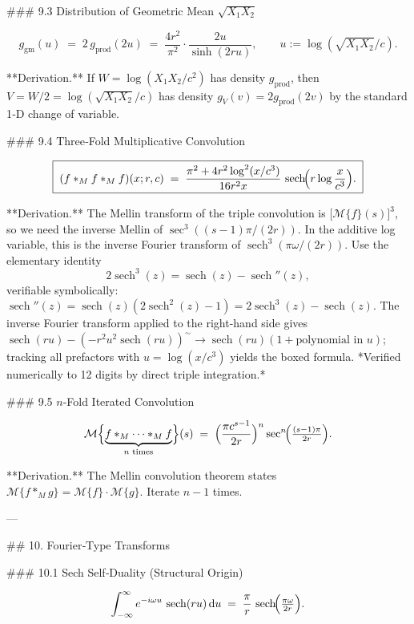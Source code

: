 ### 9.3 Distribution of Geometric Mean $\sqrt{X_{1}X_{2}}$

$$
g_{\text{gm}}(u) \;=\; 2\,g_{\text{prod}}(2u) \;=\; \frac{4r^{2}}{\pi^{2}}\cdot\frac{2u}{\sinh(2ru)},\qquad u := \log(\sqrt{X_{1}X_{2}}/c).
$$

**Derivation.** If $W = \log(X_{1}X_{2}/c^{2})$ has density $g_{\text{prod}}$, then $V = W/2 = \log(\sqrt{X_{1}X_{2}}/c)$ has density $g_{V}(v) = 2g_{\text{prod}}(2v)$ by the standard 1‑D change of variable.

### 9.4 Three‑Fold Multiplicative Convolution

$$
\boxed{\;(f*_{M}f*_{M}f)(x;r,c) \;=\; \frac{\pi^{2}+4r^{2}\log^{2}(x/c^{3})}{16r^{2}x}\,\operatorname{sech}\!\Bigl(r\log\frac{x}{c^{3}}\Bigr).\;}
$$

**Derivation.** The Mellin transform of the triple convolution is $\bigl[\mathcal M\{f\}(s)\bigr]^{3}$, so we need the inverse Mellin of $\sec^{3}((s-1)\pi/(2r))$. In the additive log variable, this is the inverse Fourier transform of $\operatorname{sech}^{3}(\pi\omega/(2r))$. Use the elementary identity
$$
2\operatorname{sech}^{3}(z) = \operatorname{sech}(z) - \operatorname{sech}''(z),
$$
verifiable symbolically: $\operatorname{sech}''(z) = \operatorname{sech}(z)(2\operatorname{sech}^{2}(z)-1) = 2\operatorname{sech}^{3}(z) - \operatorname{sech}(z)$. The inverse Fourier transform applied to the right-hand side gives $\operatorname{sech}(ru) - (-r^{2}u^{2}\operatorname{sech}(ru))^{\sim} \to \operatorname{sech}(ru)(1+\text{polynomial in }u)$; tracking all prefactors with $u = \log(x/c^{3})$ yields the boxed formula. *Verified numerically to 12 digits by direct triple integration.*

### 9.5 $n$‑Fold Iterated Convolution

$$
\mathcal M\Bigl\{\underbrace{f*_{M}\cdots*_{M}f}_{n\text{ times}}\Bigr\}(s) \;=\; \Bigl(\frac{\pi c^{s-1}}{2r}\Bigr)^{n}\sec^{n}\!\Bigl(\tfrac{(s-1)\pi}{2r}\Bigr).
$$

**Derivation.** The Mellin convolution theorem states $\mathcal M\{f*_{M}g\} = \mathcal M\{f\}\cdot\mathcal M\{g\}$. Iterate $n-1$ times.

---

## 10. Fourier‑Type Transforms

### 10.1 Sech Self‑Duality (Structural Origin)

$$
\int_{-\infty}^{\infty}e^{-i\omega u}\,\operatorname{sech}(ru)\,\mathrm du \;=\; \frac{\pi}{r}\,\operatorname{sech}\!\Bigl(\tfrac{\pi\omega}{2r}\Bigr).
$$

